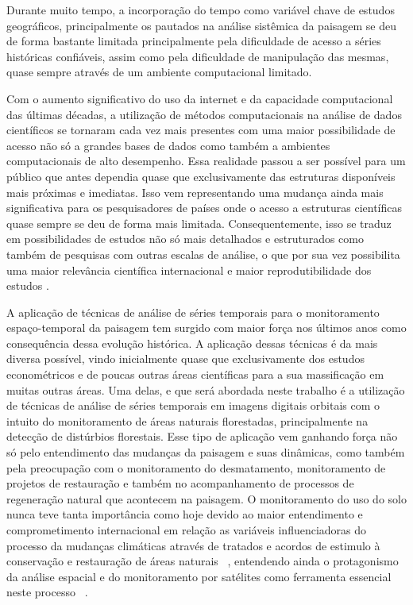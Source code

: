 \documentclass[twocolumn]{article}
\begin{document}
Durante muito tempo, a incorporação do tempo como variável chave de estudos geográficos, principalmente os pautados na análise sistêmica da paisagem se deu de forma bastante limitada principalmente pela dificuldade de acesso a séries históricas confiáveis, assim como pela dificuldade de manipulação das mesmas, quase sempre através de um ambiente computacional limitado.
\par
Com o aumento significativo do uso da internet e da capacidade computacional das últimas décadas, a utilização de métodos computacionais na análise de dados científicos se tornaram cada vez mais presentes com uma maior possibilidade de acesso não só a grandes bases de dados como também a ambientes computacionais de alto desempenho. Essa realidade passou a ser possível para um público que antes dependia quase que exclusivamente das estruturas disponíveis mais próximas e imediatas. Isso vem representando uma mudança ainda mais significativa para os pesquisadores de países onde o acesso a estruturas científicas quase sempre se deu de forma mais limitada. Consequentemente, isso se traduz em possibilidades de estudos não só mais detalhados e estruturados como também de pesquisas com outras escalas de análise, o que por sua vez possibilita uma maior relevância científica internacional e maior reprodutibilidade dos estudos \cite{ArribasBel2018}.
\par
A aplicação de técnicas de análise de séries temporais para o monitoramento espaço-temporal da paisagem tem surgido com maior força nos últimos anos como consequência dessa evolução histórica. A aplicação dessas técnicas é da mais diversa possível, vindo inicialmente quase que exclusivamente dos estudos econométricos e de poucas outras áreas científicas para a sua massificação em muitas outras áreas. Uma delas, e que será abordada neste trabalho é a utilização de técnicas de análise de séries temporais em imagens digitais orbitais com o intuito do monitoramento de áreas naturais florestadas, principalmente na detecção de distúrbios florestais. Esse tipo de aplicação vem ganhando força não só pelo entendimento das mudanças da paisagem e suas dinâmicas, como também pela preocupação com o monitoramento do desmatamento, monitoramento de projetos de restauração e também no acompanhamento de processos de regeneração natural que acontecem na paisagem. O monitoramento do uso do solo nunca teve tanta importância como hoje devido ao maior entendimento e comprometimento internacional em relação as variáveis influenciadoras do processo da mudanças climáticas através de tratados e acordos de estimulo à conservação e restauração de áreas naturais ~\cite{ALMEIDA201934}, entendendo ainda o protagonismo da análise espacial e do monitoramento por satélites como ferramenta essencial neste processo ~\cite{WHITE2019}. 
\end{document}

